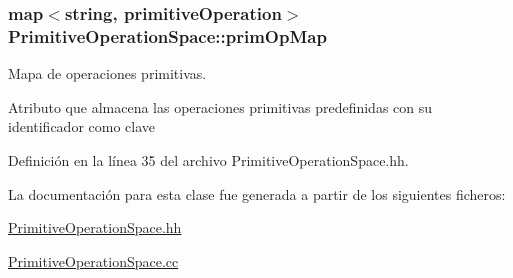 \subsubsection[{\texorpdfstring{prim\+Op\+Map}{primOpMap}}]{\setlength{\rightskip}{0pt plus 5cm}map$<$string, {\bf primitive\+Operation}$>$ Primitive\+Operation\+Space\+::prim\+Op\+Map\hspace{0.3cm}{\ttfamily [private]}}\hypertarget{class_primitive_operation_space_afd359615001ed1e9b44b9618287834ec}{}\label{class_primitive_operation_space_afd359615001ed1e9b44b9618287834ec}


Mapa de operaciones primitivas. 

Atributo que almacena las operaciones primitivas predefinidas con su identificador como clave 

Definición en la línea 35 del archivo Primitive\+Operation\+Space.\+hh.



La documentación para esta clase fue generada a partir de los siguientes ficheros\+:\begin{DoxyCompactItemize}
\item 
\hyperlink{_primitive_operation_space_8hh}{Primitive\+Operation\+Space.\+hh}\item 
\hyperlink{_primitive_operation_space_8cc}{Primitive\+Operation\+Space.\+cc}\end{DoxyCompactItemize}

